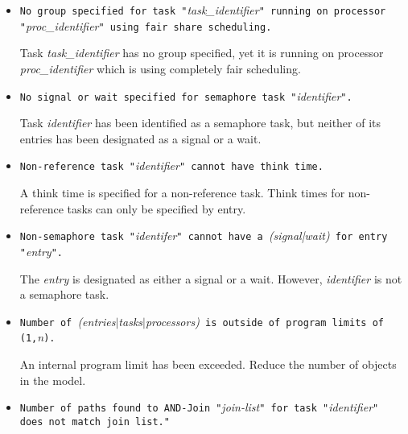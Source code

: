 \begin{itemize}
\item \texttt{No group specified for task "}\emph{task\_identifier}\texttt{" running on processor
    "}\emph{proc\_identifier}\texttt{" using fair share scheduling.}

  Task \emph{task\_identifier} has no group specified, yet it is running on processor
  \emph{proc\_identifier} which is using completely fair scheduling.

\item \texttt{No signal or wait specified for semaphore task "}\emph{identifier}\texttt{".}
  
  Task \emph{identifier} has been identified as a semaphore
  task, but neither of its entries has been designated as a
  signal or a wait.

\item \texttt{Non-reference task "}\emph{identifier}\texttt{" cannot
    have think time.}
  
  A think time is specified for a non-reference
  task.  Think times for non-reference tasks can only be specified by
  entry.

\item \texttt{Non-semaphore task "}\emph{identifer}\texttt{" cannot have a }\emph{(signal|wait)}\texttt{ for
    entry "}\emph{entry}\texttt{".}

  The \emph{entry} is designated as either a signal or a
  wait.  However, \emph{identifier} is not a semaphore
  task. 

\item \texttt{Number of }\emph{(entries$|$tasks$|$processors)}\texttt{
    is outside of program limits of (1,}\emph{n}\texttt{).}

  An internal program limit has been exceeded.  Reduce the number of
  objects in the model.

\item \texttt{Number of paths found to AND-Join
    "}\emph{join-list}\texttt{" for task "}\emph{identifier}\texttt{"
    does not match join list." }
  

\end{itemize}
